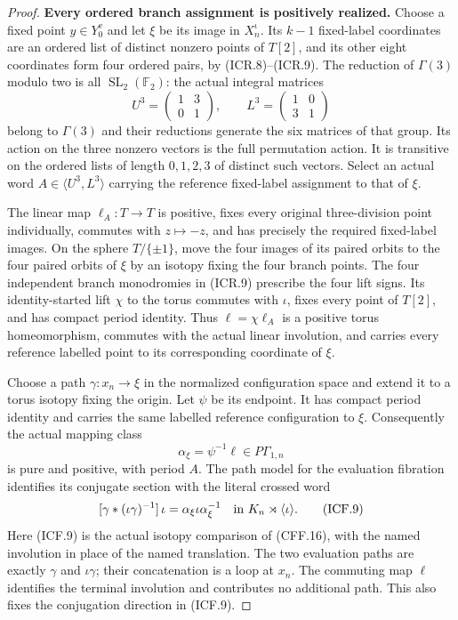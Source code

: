 \begin{proof}
\par\medskip\noindent\textbf{Every ordered branch assignment is positively realized.}\quad
Choose a fixed point $y\in Y_0^v$ and let $\xi$ be its image
in $X_n^\iota$.  Its $k-1$ fixed-label coordinates are an ordered
list of distinct nonzero points of $T[2]$, and its other eight
coordinates form four ordered pairs, by (ICR.8)--(ICR.9).
The reduction of $\Gamma(3)$ modulo two is all
$\operatorname{SL}_2(\mathbb F_2)$: the actual integral matrices
\[
 U^3=\begin{pmatrix}1&3\\0&1\end{pmatrix},\qquad
 L^3=\begin{pmatrix}1&0\\3&1\end{pmatrix}
                                                               \tag{ICF.7}
\]
belong to $\Gamma(3)$ and their reductions generate the six
matrices of that group.  Its action on the three nonzero vectors
is the full permutation action.  It is transitive on the ordered
lists of length $0,1,2,3$ of distinct such vectors.  Select an
actual word $A\in\langle U^3,L^3\rangle$ carrying the reference
fixed-label assignment to that of $\xi$.

The linear map $\ell_A:T\to T$ is positive, fixes every
original three-division point individually, commutes with
$z\mapsto-z$, and has precisely the required fixed-label images.
On the sphere $T/\{\pm1\}$, move the four images of its paired
orbits to the four paired orbits of $\xi$ by an isotopy fixing
the four branch points.  The four independent branch monodromies
in (ICR.9) prescribe the four lift signs.  Its identity-started
lift $\chi$ to the torus commutes with $\iota$, fixes every
point of $T[2]$, and has compact period identity.
Thus $\ell=\chi\ell_A$ is a positive torus homeomorphism,
commutes with the actual linear involution, and carries every
reference labelled point to its corresponding coordinate of
$\xi$.

Choose a path $\gamma:x_n\to\xi$ in the normalized configuration
space and extend it to a torus isotopy fixing the origin.  Let
$\psi$ be its endpoint.  It has compact period identity and
carries the same labelled reference configuration to $\xi$.
Consequently the actual mapping class
\[
                         \alpha_\xi=\psi^{-1}\ell
                                     \in P\Gamma_{1,n}
                                                               \tag{ICF.8}
\]
is pure and positive, with period $A$.  The path model for the
evaluation fibration identifies its conjugate section with the
literal crossed word
\[
                [\gamma*(\iota\gamma)^{-1}]\,\iota
                    =\alpha_\xi\iota\alpha_\xi^{-1}
                   \quad\hbox{in }K_n\rtimes\langle\iota\rangle.
                                                               \tag{ICF.9}
\]
Here (ICF.9) is the actual isotopy comparison of (CFF.16), with
the named involution in place of the named translation.  The two
evaluation paths are exactly $\gamma$ and $\iota\gamma$; their
concatenation is a loop at $x_n$.  The commuting map $\ell$
identifies the terminal involution and contributes no additional
path.  This also fixes the conjugation direction in (ICF.9).


\end{proof}
